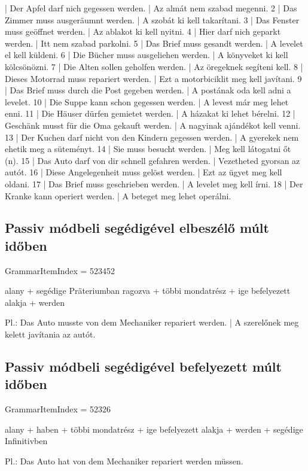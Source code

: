 \documentclass{article}
\newenvironment{desc}{\verbatim}{\endverbatim}
\newenvironment{exmp}{\verbatim}{\endverbatim}
\begin{document}
\begin{exmp}
1 | Der Apfel darf nich gegessen werden. | Az almát nem szabad megenni.
2 | Das Zimmer muss ausgeräumnt werden. | A szobát ki kell takarítani.
3 | Das Fenster muss geöffnet werden. | Az ablakot ki kell nyitni.
4 | Hier darf nich geparkt werden. | Itt nem szabad parkolni.
5 | Das Brief muss gesandt werden. | A levelet el kell küldeni.
6 | Die Bücher muss ausgeliehen werden. | A könyveket ki kell kölcsönözni.
7 | Die Alten sollen geholfen werden. | Az öregeknek segíteni kell.
8 | Dieses Motorrad muss repariert werden. | Ezt a motorbiciklit meg kell javítani.
9 | Das Brief muss durch die Post gegeben werden. | A postának oda kell adni a levelet.
10 | Die Suppe kann schon gegessen werden. | A levest már meg lehet enni.
11 | Die Häuser dürfen gemietet werden. | A házakat ki lehet bérelni.
12 | Geschänk musst für die Oma gekauft werden. | A nagyinak ajándékot kell venni.
13 | Der Kuchen darf nicht von den Kindern gegessen werden. | A gyerekek nem ehetik meg a süteményt.
14 | Sie muss besucht werden. | Meg kell látogatni őt (n).
15 | Das Auto darf von dir schnell gefahren werden. | Vezetheted gyorsan az autót.
16 | Diese Angelegenheit muss gelöst werden. | Ezt az ügyet meg kell oldani.
17 | Das Brief muss geschrieben werden. | A levelet meg kell írni.
18 | Der Kranke kann operiert werden. | A beteget meg lehet operálni.
\end{exmp}

\subsection{Passiv módbeli segédigével elbeszélő múlt időben}

GrammarItemIndex = 523452

\begin{desc}
alany + segédige Präteriumban ragozva + többi mondatrész + ige befelyezett alakja + werden

Pl.: Das Auto musste von dem Mechaniker repariert werden. | A szerelőnek meg kelett javítania az autót.
\end{desc}

\subsection{Passiv módbeli segédigével befelyezett múlt időben}

GrammarItemIndex = 52326

\begin{desc}
alany + haben + többi mondatrész + ige befelyezett alakja + werden + segédige Infinitivben

Pl.: Das Auto hat von dem Mechaniker repariert werden müssen.
\end{desc}
\end{document}
